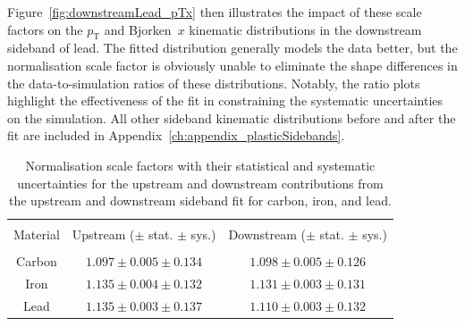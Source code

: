 Figure~\ref{fig:downstreamLead_pTx} then illustrates the impact of these scale factors on the $p_{\text{T}}$ and Bjorken~$x$ kinematic distributions in the downstream sideband of lead. The fitted distribution generally models the data better, but the normalisation scale factor is obviously unable to eliminate the shape differences in the data-to-simulation ratios of these distributions. Notably, the ratio plots highlight the effectiveness of the fit in constraining the systematic uncertainties on the simulation. All other sideband kinematic distributions before and after the fit are included in Appendix~\ref{ch:appendix_plasticSidebands}. 

\vspace{10pt}
\begin{table}[h]
    \centering
    \begin{tabular}{c c c }
    \hline \\ [-1.5 ex]
    Material & Upstream ($\pm$ stat. $\pm$ sys.) & Downstream ($\pm$ stat. $\pm$ sys.) \\ [0.5ex] %
    \hline
    \hline \\[-1.8ex] 
    Carbon & $1.097 \pm 0.005 \pm 0.134$ & $1.098 \pm 0.005 \pm 0.126$ \\
    Iron & $1.135 \pm 0.004 \pm 0.132$ & $1.131 \pm 0.003 \pm 0.131$ \\
    Lead & $1.135 \pm 0.003 \pm 0.137$ & $1.110 \pm 0.003 \pm 0.132$ \\
    \hline
    \end{tabular}
    \caption{Normalisation scale factors with their statistical and systematic uncertainties for the upstream and downstream contributions from the upstream and downstream sideband fit for carbon, iron, and lead.}
    \label{table:scaleFactors}
\end{table}

